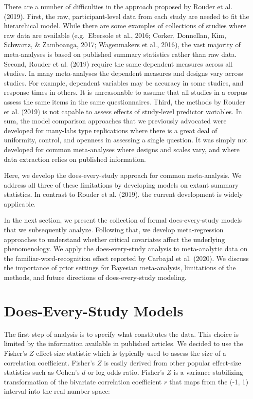 \documentclass[english,,man]{apa6}
\begin{document}
There are a number of difficulties in the approach proposed by Rouder et al. (2019). First, the raw, participant-level data from each study are needed to fit the hierarchical model. While there are some examples of collections of studies where raw data are available (e.g.~Ebersole et al., 2016; Corker, Donnellan, Kim, Schwartz, \& Zamboanga, 2017; Wagenmakers et al., 2016), the vast majority of meta-analyses is based on published summary statistics rather than raw data. Second, Rouder et al. (2019) require the same dependent measures across all studies. In many meta-analyses the dependent measures and designs vary across studies. For example, dependent variables may be accuracy in some studies, and response times in others. It is unreasonable to assume that all studies in a corpus assess the same items in the same questionnaires. Third, the methods by Rouder et al. (2019) is not capable to assess effects of study-level predictor variables. In sum, the model comparison approaches that we previously advocated were developed for many-labs type replications where there is a great deal of uniformity, control, and openness in assessing a single question. It was simply not developed for common meta-analyses where designs and scales vary, and where data extraction relies on published information.

Here, we develop the does-every-study approach for common meta-analysis. We address all three of these limitations by developing models on extant summary statistics. In contrast to Rouder et al. (2019), the current development is widely applicable.

In the next section, we present the collection of formal does-every-study models that we subsequently analyze. Following that, we develop meta-regression approaches to understand whether critical covariates affect the underlying phenomenology. We apply the does-every-study analysis to meta-analytic data on the familiar-word-recognition effect reported by Carbajal et al. (2020). We discuss the importance of prior settings for Bayesian meta-analysis, limitations of the methods, and future directions of does-every-study modeling.

\hypertarget{does-every-study-models}{%
\section{Does-Every-Study Models}\label{does-every-study-models}}

The first step of analysis is to specify what constitutes the data. This choice is limited by the information available in published articles. We decided to use the Fisher's \(Z\) effect-size statistic which is typically used to assess the size of a correlation coefficient. Fisher's \(Z\) is easily derived from other popular effect-size statistics such as Cohen's \(d\) or log odds ratio. Fisher's \(Z\) is a variance stabilizing transformation of the bivariate correlation coefficient \(r\) that maps from the (-1, 1) interval into the real number space:
\end{document}
